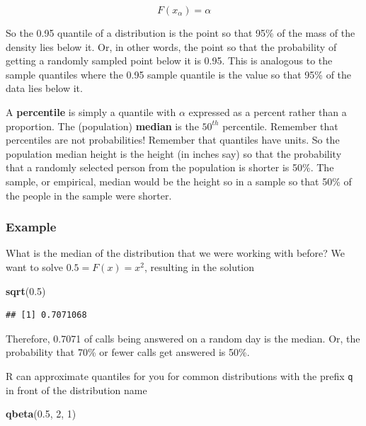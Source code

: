 \documentclass[]{article}
\newenvironment{Shaded}{\begin{snugshade}}{\end{snugshade}}
\newcommand{\KeywordTok}[1]{\textcolor[rgb]{0.13,0.29,0.53}{\textbf{{#1}}}}
\newcommand{\DecValTok}[1]{\textcolor[rgb]{0.00,0.00,0.81}{{#1}}}
\newcommand{\FloatTok}[1]{\textcolor[rgb]{0.00,0.00,0.81}{{#1}}}
\newcommand{\NormalTok}[1]{{#1}}
\begin{document}
\[
F(x_\alpha) = \alpha
\]

So the 0.95 quantile of a distribution is the point so that 95\% of the
mass of the density lies below it. Or, in other words, the point so that
the probability of getting a randomly sampled point below it is 0.95.
This is analogous to the sample quantiles where the 0.95 sample quantile
is the value so that 95\% of the data lies below it.

A \textbf{percentile} is simply a quantile with $\alpha$ expressed as a
percent rather than a proportion. The (population) \textbf{median} is
the $50^{th}$ percentile. Remember that percentiles are not
probabilities! Remember that quantiles have units. So the population
median height is the height (in inches say) so that the probability that
a randomly selected person from the population is shorter is 50\%. The
sample, or empirical, median would be the height so in a sample so that
50\% of the people in the sample were shorter.

\subsubsection{Example}\label{example-3}

What is the median of the distribution that we were working with before?
We want to solve $0.5 = F(x) = x^2$, resulting in the solution

\begin{Shaded}
\begin{Highlighting}[]
\KeywordTok{sqrt}\NormalTok{(}\FloatTok{0.5}\NormalTok{)}
\end{Highlighting}
\end{Shaded}

\begin{verbatim}
## [1] 0.7071068
\end{verbatim}

Therefore, 0.7071 of calls being answered on a random day is the median.
Or, the probability that 70\% or fewer calls get answered is 50\%.

R can approximate quantiles for you for common distributions with the
prefix \texttt{q} in front of the distribution name

\begin{Shaded}
\begin{Highlighting}[]
\KeywordTok{qbeta}\NormalTok{(}\FloatTok{0.5}\NormalTok{, }\DecValTok{2}\NormalTok{, }\DecValTok{1}\NormalTok{)}
\end{Highlighting}
\end{Shaded}
\end{document}
